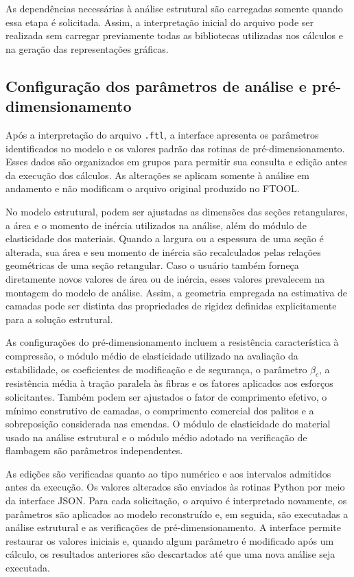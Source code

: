 As dependências necessárias à análise estrutural são carregadas somente quando essa etapa é solicitada. Assim, a interpretação inicial do arquivo pode ser realizada sem carregar previamente todas as bibliotecas utilizadas nos cálculos e na geração das representações gráficas.

\subsection{Configuração dos parâmetros de análise e pré-dimensionamento}
\label{subsec:parametros-web}

Após a interpretação do arquivo \texttt{.ftl}, a interface apresenta os parâmetros identificados no modelo e os valores padrão das rotinas de pré-dimensionamento. Esses dados são organizados em grupos para permitir sua consulta e edição antes da execução dos cálculos. As alterações se aplicam somente à análise em andamento e não modificam o arquivo original produzido no \acrshort{FTOOL}.

No modelo estrutural, podem ser ajustadas as dimensões das seções retangulares, a área e o momento de inércia utilizados na análise, além do módulo de elasticidade dos materiais. Quando a largura ou a espessura de uma seção é alterada, sua área e seu momento de inércia são recalculados pelas relações geométricas de uma seção retangular. Caso o usuário também forneça diretamente novos valores de área ou de inércia, esses valores prevalecem na montagem do modelo de análise. Assim, a geometria empregada na estimativa de camadas pode ser distinta das propriedades de rigidez definidas explicitamente para a solução estrutural.

As configurações do pré-dimensionamento incluem a resistência característica à compressão, o módulo médio de elasticidade utilizado na avaliação da estabilidade, os coeficientes de modificação e de segurança, o parâmetro \(\beta_c\), a resistência média à tração paralela às fibras e os fatores aplicados aos esforços solicitantes. Também podem ser ajustados o fator de comprimento efetivo, o mínimo construtivo de camadas, o comprimento comercial dos palitos e a sobreposição considerada nas emendas. O módulo de elasticidade do material usado na análise estrutural e o módulo médio adotado na verificação de flambagem são parâmetros independentes.

As edições são verificadas quanto ao tipo numérico e aos intervalos admitidos antes da execução. Os valores alterados são enviados às rotinas Python por meio da interface \gls{JSON}. Para cada solicitação, o arquivo é interpretado novamente, os parâmetros são aplicados ao modelo reconstruído e, em seguida, são executadas a análise estrutural e as verificações de pré-dimensionamento. A interface permite restaurar os valores iniciais e, quando algum parâmetro é modificado após um cálculo, os resultados anteriores são descartados até que uma nova análise seja executada.

